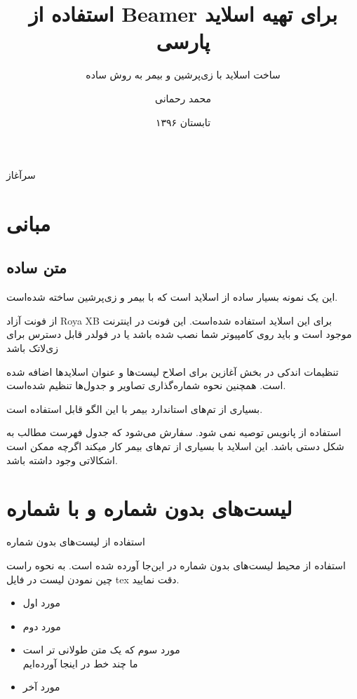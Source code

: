 \documentclass{beamer}
\title{
استفاده از Beamer برای تهیه اسلاید پارسی
}
\subtitle{ساخت اسلاید با زی‌پرشین و بیمر به روش ساده‌}
\author{محمد رحمانی}
\institute{دانشگاه صنعتی امیرکبیر}
\date{تابستان ۱۳۹۶}
\makeatletter
\newcommand{ \RTList}{\raggedleft\rightskip\@totalleftmargin}
\makeatother
\begin{document}
\begin{persian}
\begin{frame}
\maketitle
\end{frame}

\everypar{\rightskip\rightmargin}
\begin{frame}{سرآغاز}
\section{مبانی}
\subsection{متن ساده}
این یک نمونه بسیار ساده از اسلاید است که با بیمر و زی‌پرشین ساخته شده‌است.

از فونت آزاد Roya XB برای این اسلاید استفاده شده‌است. این فونت در اینترنت موجود است و باید روی کامپیوتر شما نصب شده باشد یا در فولدر قابل دسترس برای زی‌لاتک باشد

تنظیمات اندکی در بخش آغازین برای اصلاح لیست‌ها و عنوان اسلایدها اضافه شده است. همچنین نحوه شماره‌گذاری تصاویر و جدول‌ها تنظیم شده‌است.

بسیاری از تم‌های استاندارد بیمر با این الگو قابل استفاده است.

استفاده از پانویس توصیه نمی شود. سفارش می‌شود که جدول فهرست مطالب به شکل دستی باشد. این اسلاید با بسیاری از تم‌های بیمر کار میکند اگرچه ممکن است اشکالاتی وجود داشته باشد.
\end{frame}

\section{لیست‌های بدون شماره و با شماره}
\begin{frame}{استفاده از لیست‌های بدون شماره}

استفاده از محیط لیست‌های بدون شماره در این‌جا آورده شده است. به نحوه راست چین نمودن لیست در فایل tex دقت نمایید.
\begin{itemize}\RTList
	\item مورد اول
	\item مورد دوم
	\item مورد سوم که یک متن طولانی تر است\\ ما چند خط در اینجا آورده‌ایم
	\item مورد آخر
\end{itemize}
\end{frame}


\end{persian}
\end{document}
